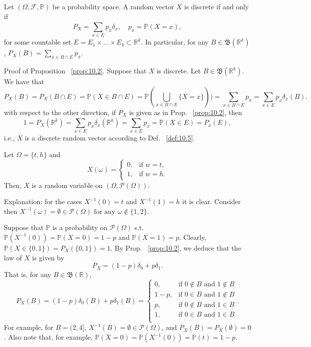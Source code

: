 \begin{proposition}
    \label{prop:10.2}
    Let $(\Omega, \mathcal{F}, \mathbb{P})$ be a probability space. A random vector $X$ is discrete if
    and only if
    \[
    P_X = \sum_{x \in E}^{} p_x {\delta}_x, \quad p_x = \mathbb{P}(X = x)
    ,\] 
    for some countable set $E = E_1 \times \ldots \times E_k \subset \mathbb{R}^{k}$. In particular, for
    any $B \in  \mathfrak{B}(\mathbb{R}^{k})$, $P_X(B) = \sum_{x \in B \cap E}^{} p_x$.
\end{proposition}

Proof of Proposition ~\ref{prop:10.2}. Suppose that $X$ is discrete. Let $B \in 
\mathfrak{B}(\mathbb{R}^{k})$. We have that
\[
P_X(B) = P_X(B \cap E) = \mathbb{P}(X \in B \cap E) 
= \mathbb{P}(\bigcup_{x \in B \cap E}\{X = x\} ) ) = \sum_{x \in B\cap E}^{ } p_x
= \sum_{x \in E}^{ } p_x {\delta}_x(B)
.\] 
with respect to the other direction, if $P_X$ is given as in Prop. ~\ref{prop:10.2}, then
\[
1 = P_X(\mathbb{R}^{k}) = \sum_{x \in E}^{ } p_x {\delta}_x(\mathbb{R}^{k})
= \sum_{x \in E}^{ } p_x = \mathbb{P}(X \in E) = P_x(E)
,\] 
i.e., $X$ is a discrete random vector according to Def. ~\ref{def:10.5}.

\begin{example}
    \label{ex:Tail,_head}
    Let $\Omega = \{t, h\} $ and
    \[
    X(\omega) = 
    \begin{cases}
        0, & \text{if } w=t, \\
        1, & \text{if } w = h.
    \end{cases}
    \] 
    Then, $X$ is a random variable on $(\Omega, \mathcal{P}(\Omega))$.

    Explanation: for the cases $X^{-1}(0) = t$ and $X^{-1}(1) = h$ it is clear. Consider then 
    $X^{-1}(\omega) = \emptyset \in \mathcal{P}(\Omega) \text{ for any } \omega \not\in \{1, 2\} $.

    Suppose that $\mathbb{P}$ is a probability on $\mathcal{P}(\Omega)$ s.t. $\mathbb{P}(X^{-1}(0)) 
    = \mathbb{P}(X=0) = 1-p$ and $\mathbb{P}(X=1)=p$.     
    Clearly, $\mathbb{P}(X \in \{0,1\} ) = P_X(\{0,1\} ) = 1$. By Prop. ~\ref{prop:10.2}, we deduce
    that the law of $X$ is given by
    \[
    P_X = (1-p) \delta _0 + p\delta _1
    .\] 
    That is, for any $B \in \mathfrak{B}(\mathbb{R})$,
    \[
    P_X(B)= (1-p) \delta _0(B) + p\delta _1(B)=
    \begin{cases}
        0, & \text{if } 0 \not\in B \text{ and } 1 \not\in B \\
        1-p, & \text{if } 0 \in B \text{ and } 1 \not\in B \\
        p, & \text{if } 0 \not\in B \text{ and } 1 \in B \\
        1, & \text{if } 0 \in B \text{ and } 1 \in B \\
    \end{cases}
    .\] 
    For example, for $B = (2, 4]$, $X^{-1}(B) = \emptyset \in \mathcal{P}(\Omega)$, and
    $P_X(B) = P_X(\emptyset) = 0$. Also note that, for example, $\mathbb{P}(X=0) 
    = \mathbb{P}(X^{-1}(0)) = \mathbb{P}(t) = 1-p$.
\end{example}

